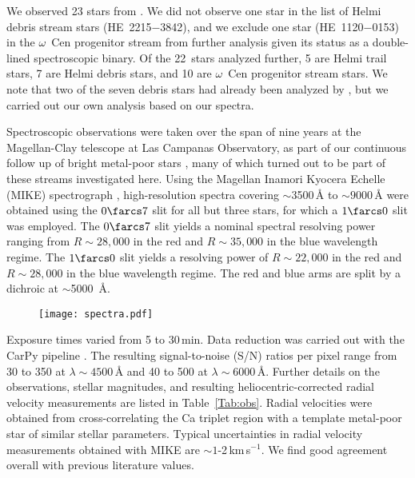 \documentclass[twocolumn]{aastex63}
\newcommand{\kms}{km\,s$^{-1}$}
\begin{document}
We observed 23 stars from \citet{beers17}. We did not observe one star in the \citet{beers17} list of Helmi debris stream stars (HE~2215$-$3842), and we exclude one star (HE~1120$-$0153) in the $\omega$~Cen progenitor stream from further analysis given its status as a double-lined spectroscopic binary. Of the 22~stars analyzed further, 5 are Helmi trail stars, 7 are Helmi debris stars, and 10 are $\omega$~Cen progenitor stream stars. We note that two of the seven debris stars had already been analyzed by \citet{Roederer10}, but we carried out our own analysis based on our spectra. 


Spectroscopic observations were taken over the span of nine years at the Magellan-Clay telescope at Las Campanas Observatory, as part of our continuous follow up of bright metal-poor stars \citep{Frebel06b}, many of which turned out to be part of these streams investigated here.
Using the Magellan Inamori Kyocera Echelle (MIKE) spectrograph \citep{Bernstein03}, high-resolution spectra covering $\sim$3500\,{\AA} to $\sim9000$\,{\AA} were obtained using the $0\farcs7$ slit for all but three stars, for which a $1\farcs0$ slit was employed. The $0\farcs7$ slit yields a nominal spectral resolving power ranging from $R \sim28,000$ in the red and $R\sim35,000$ in the blue wavelength regime. The $1\farcs0$ slit yields a resolving power of $R\sim22,000$ in the red and $R\sim28,000$ in the blue wavelength regime. The red and blue arms are split by a dichroic at $\sim$5000~{\AA}. 


\begin{figure*}[!ht]
 \begin{center}
  \texttt{[image: spectra.pdf]} 
 \end{center}
\end{figure*}

Exposure times varied from 5 to 30\,min. Data reduction was carried out with the CarPy pipeline \citep{Kelson03}. The resulting signal-to-noise (S/N) ratios per pixel range from 30 to 350 at $\lambda \sim 4500$\,\AA$ $ and 40 to 500 at $\lambda \sim 6000$\,\AA. Further details on the observations, stellar magnitudes, and resulting heliocentric-corrected radial velocity measurements are listed in Table~\ref{Tab:obs}. 
Radial velocities were obtained from cross-correlating the Ca triplet region with a template metal-poor star of similar stellar parameters. 
Typical uncertainties in radial velocity measurements obtained with MIKE are $\sim1$-2\,\kms. We find good agreement overall with previous literature values. 
\end{document}
